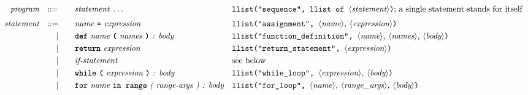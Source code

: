 \begin{alignat*}{9}
  && \textit{program}      && ::= &\quad && \textit{statement}\ \ldots
                                                            && \texttt{llist("sequence", llist of  } \langle \textit{statement}\rangle \texttt{)} \textrm{; a single statement stands for itself}                                                                              \\[1mm]
  && \textit{statement}    && ::= &\quad && \textit{name}\ \textbf{\texttt{=}}\  \textit{expression}
                                                            && \texttt{llist("assignment",  } \langle \textit{name}\rangle \textit{,  } \langle \textit{expression}\rangle \texttt{)}                                      \\
  &&                       && |   &\quad && \textbf{\texttt{def}}\  \textit{name} \ \textbf{\texttt{(}}\  \textit{names} \ \textbf{\texttt{)}}\ \textit{: body} \quad
                                                            &&  \texttt{llist("function\_definition",  } \langle \textit{name}\rangle \textit{, } \langle \textit{names}\rangle \textit{,}\ \langle \textit{body}\rangle \texttt{)} \\
  &&                       && |   &\quad && \textbf{\texttt{return}}\  \textit{expression}
                                                            && \texttt{llist("return\_statement",  } \langle \textit{expression}\rangle \texttt{)}                                                                                    \\
  &&                       && |   &\quad && \textit{if-statement} \quad
                                                            && \textrm{see below}                                                                                                                                                            \\
  &&                       && |   &\quad && \textbf{\texttt{while}}\ \textbf{\texttt{(}}\  \textit{expression} \ \textbf{\texttt{)}} \ \textit{: body}
                                                            && \texttt{llist("while\_loop",  } \langle \textit{expression}\rangle \textit{,  } \langle \textit{body}\rangle \texttt{)}                                               \\
  &&                       && |   &\quad && \textbf{\texttt{for}}\ \textit{name}\ \textbf{\texttt{in range}}\ \textit{( range-args ) : body}
                                                            && \texttt{llist("for\_loop",  } \langle \textit{name}\rangle \textit{,  } \langle \textit{range\_args}\rangle \textit{,  } \langle \textit{body}\rangle \texttt{)}                                                \\

\end{alignat*}
